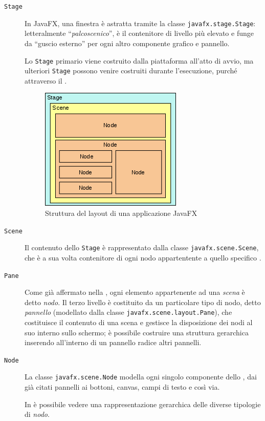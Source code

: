             \begin{description}
                \item[\texttt{Stage}]\label{itm:stg} In JavaFX, una finestra è astratta tramite la classe \texttt{javafx\dothyp stage\dothyp Stage}: letteralmente ``\emph{palcoscenico}'',  è il contenitore di livello più elevato e funge da ``guscio esterno'' per ogni altro componente grafico e pannello.

                Lo \texttt{Stage} primario viene costruito dalla piattaforma all'atto di avvio, ma ulteriori \texttt{Stage} possono venire costruiti durante l'esecuzione, purché attraverso il .

            \begin{figure}[htbp]
                \centering
                \includegraphics[scale=1]{img/Javafx-stage-scene-node}
                \caption{Struttura del layout di una applicazione JavaFX}
                \label{fig:jfxStage}
            \end{figure}

                \item[\texttt{Scene}]\label{itm:scn} Il contenuto dello \texttt{Stage} è rappresentato dalla classe \texttt{javafx\dothyp scene\dothyp Scene}, che è a sua volta contenitore di ogni nodo appartentente a quello specifico .

                \item[\texttt{Pane}]\label{itm:pane} Come già affermato nella , ogni elemento appartenente ad una \emph{scena} è detto \emph{nodo}. Il terzo livello è costituito da un particolare tipo di nodo, detto \emph{pannello} (modellato dalla classe \texttt{javafx\dothyp scene\dothyp layout\dothyp Pane}), che costituisce il contenuto di una scena e gestisce la disposizione dei nodi al suo interno sullo schermo; è possibile costruire una struttura gerarchica inserendo all'interno di un pannello radice altri pannelli.

                \item[\texttt{Node}]\label{itm:nod} La classe \texttt{javafx\dothyp scene\dothyp Node} modella ogni singolo componente dello , dai già citati pannelli ai bottoni, canvas, campi di testo e così via.

                In  è possibile vedere una rappresentazione gerarchica delle diverse tipologie di \emph{nodo}.
            \end{description}

